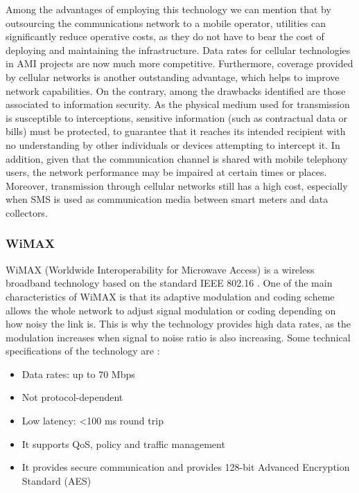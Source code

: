 \documentclass[11pt,draftclsnofoot,onecolumn]{IEEEtran}
\begin{document}
Among the advantages of employing this technology we can mention that by outsourcing the communications network to a mobile operator, utilities can significantly reduce operative costs, as they do not have to bear the cost of deploying and maintaining the infrastructure. Data rates for cellular technologies in AMI projects are now much more competitive. Furthermore, coverage provided by cellular networks is another outstanding advantage, which helps to improve network capabilities. On the contrary, among the drawbacks identified are those associated to information security. As the physical medium used for transmission is susceptible to interceptions, sensitive information (such as contractual data or bills) must be protected, to guarantee that it reaches its intended recipient with no understanding by other individuals or devices attempting to intercept it. In addition, given that the communication channel is shared with mobile telephony users, the network performance may be impaired at certain times or places. Moreover, transmission through cellular networks still has a high cost, especially when SMS is used as communication media between smart meters and data collectors. 


\subsubsection{WiMAX}\label{tech::wimax}

WiMAX (Worldwide Interoperability for Microwave Access) is a wireless broadband technology based on the standard IEEE 802.16 \cite{IEEE80216}. One of the main characteristics of WiMAX is that its adaptive modulation and coding scheme allows the whole network to adjust signal  modulation or coding depending on how noisy the link is. This is why the technology provides high data rates, as the modulation increases when signal to noise ratio is also increasing. Some technical specifications of the technology are \cite{Aguirre2013}:

\begin{itemize}

	\item Data rates: up to 70 Mbps
	\item Not protocol-dependent
	\item Low latency: <100 ms round trip
	\item It supports QoS, policy and traffic management
	\item It provides secure communication and provides 128-bit Advanced Encryption Standard (AES)

\end{itemize}
\end{document}
